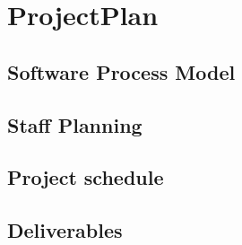 \section{ProjectPlan}

\subsection{Software Process Model}
\subsection{Staff Planning}
\subsection{Project schedule}
\subsection{Deliverables}
